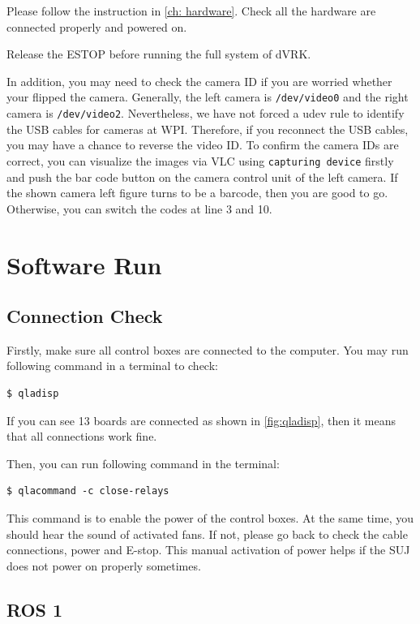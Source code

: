 Please follow the instruction in \autoref{ch: hardware}. Check all the hardware are connected properly and powered on.

Release the ESTOP before running the full system of dVRK.

In addition, you may need to check the camera ID if you are worried whether your flipped the camera. Generally, the left camera is \texttt{\slash dev\slash video0} and the right camera is \texttt{\slash dev\slash video2}. Nevertheless, we have not forced a udev rule to identify the USB cables for cameras at WPI. Therefore, if you reconnect the USB cables, you may have a chance to reverse the video ID. To confirm the camera IDs are correct, you can visualize the images via VLC using \texttt{capturing device} firstly and push the bar code button on the camera control unit of the left camera. If the shown camera left figure turns to be a barcode, then you are good to go. Otherwise, you can switch the codes at line
3 and 10.

\section{Software Run}

\subsection{Connection Check}

Firstly, make sure all control boxes are connected to the computer. You may run following command in a terminal to check:

\begin{verbatim}
$ qladisp
\end{verbatim}

If you can see 13 boards are connected as shown in \autoref{fig:qladisp}, then it means that all connections work fine. 

Then, you can run following command in the terminal:

\begin{verbatim}
$ qlacommand -c close-relays
\end{verbatim}

This command is to enable the power of the control boxes. At the same time, you should hear the sound of activated fans. If not, please go back to check the cable connections, power and E-stop. This manual activation of power helps if the SUJ does not power on properly sometimes.

\subsection{ROS 1}

